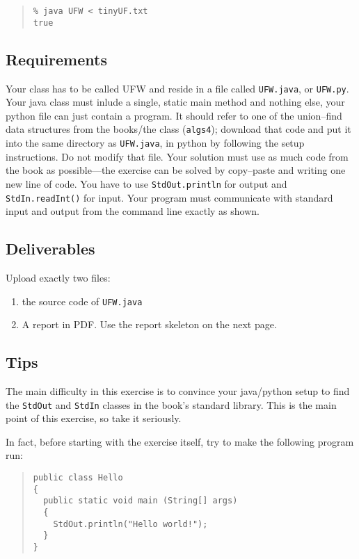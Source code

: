 \documentclass{tufte-handout}
\begin{document}
\begin{quotation}
\begin{verbatim}
% java UFW < tinyUF.txt
true
\end{verbatim}
\end{quotation}

\subsection{Requirements}

Your class has to be called UFW and reside in a file called {\tt UFW.java}, or {\tt UFW.py}.
Your java class must inlude a single, static main method and nothing else, your python file can just contain a program.
It should refer to one of the union--find data structures from the books/the class ({\tt algs4}); download that code and put it into the same directory as {\tt UFW.java}, in python by following the setup instructions.
Do not modify that file.
Your solution must use as much code from the book as possible---the exercise can be solved by copy--paste and writing one new line of code.
You have to use {\tt StdOut.println} for output and {\tt StdIn.readInt()} for input.
Your program must communicate with standard input and output from the command line exactly as shown.

\subsection{Deliverables}

Upload exactly two files:

\begin{enumerate}
\item the source code of {\tt UFW.java}
\item A report in PDF. 
  Use the report skeleton on the next page.
\end{enumerate}

\subsection{Tips}
The main difficulty in this exercise is to convince your java/python setup to find the {\tt StdOut} and {\tt StdIn} classes in the book's standard library.
This is the main point of this exercise, so take it seriously. 

In fact, before starting with the exercise itself, try to make the following program run:

\begin{quotation}
\begin{verbatim}
public class Hello
{
  public static void main (String[] args)
  {
    StdOut.println("Hello world!");
  }
}
\end{verbatim}
\end{quotation}
\end{document}
